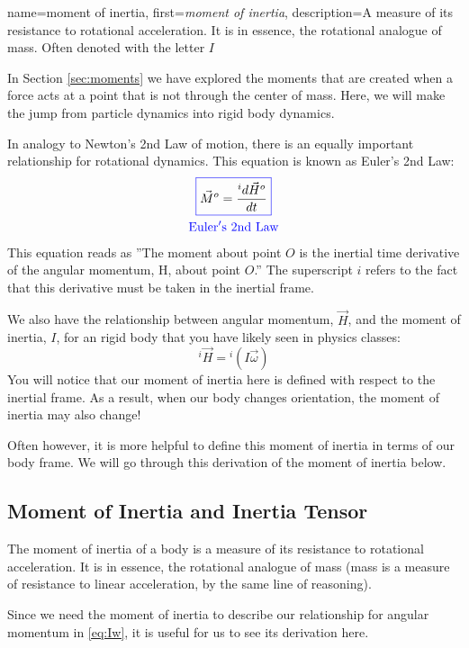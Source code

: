 \documentclass[12pt]{report}
\begin{document}
{
    name=moment of inertia,
    first={\textit{moment of inertia}},
    description={A measure of its resistance to rotational acceleration. It is in essence, the rotational analogue of mass. Often denoted with the letter $I$}
}

In Section \ref{sec:moments} we have explored the moments that are created when a force acts at a point that is not through the center of mass. Here, we will make the jump from particle dynamics into \gls{rigid body} dynamics.

In analogy to Newton's 2nd Law of motion, there is an equally important relationship for rotational dynamics. This equation is known as Euler's 2nd Law:
\begin{gather}\label{eq:Euler 2nd Law}
\color{blue}\boxed{\color{black}\vec{M}^o=\frac{{}^id\vec{H}^o}{dt}}\\
\mathrm{\color{blue}Euler's \ 2nd \ Law}
\end{gather}
This equation reads as ''The moment about point $O$ is the inertial time derivative of the angular momentum, H, about point $O$.'' The superscript $i$ refers to the fact that this derivative must be taken in the \gls{inertial frame}.

We also have the relationship between angular momentum, $\vec{H}$, and the \gls{moment of inertia}, $I$, for an \gls{rigid body} that you have likely seen in physics classes:
\begin{equation}\label{eq:Iw}
    {}^i\vec{H}={}^i(I\vec{\omega})
\end{equation}
You will notice that our \gls{moment of inertia} here is defined with respect to the \gls{inertial frame}. As a result, when our body changes orientation, the \gls{moment of inertia} may also change!

Often however, it is more helpful to define this \gls{moment of inertia} in terms of our \gls{body frame}. We will go through this derivation of the \gls{moment of inertia} below.
\subsection{Moment of Inertia and Inertia Tensor}\label{moment of inertia}
The \gls{moment of inertia} of a body is a measure of its resistance to rotational acceleration. It is in essence, the rotational analogue of mass (mass is a measure of resistance to linear acceleration, by the same line of reasoning).

Since we need the \gls{moment of inertia} to describe our relationship for angular momentum in \eqref{eq:Iw}, it is useful for us to see its derivation here.
\end{document}
